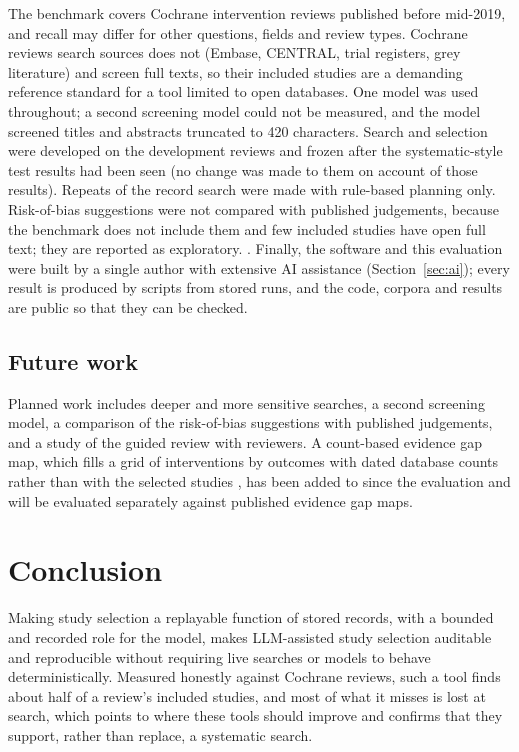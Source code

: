 The benchmark covers Cochrane intervention reviews published before mid-2019, and recall may differ for other
questions, fields and review types. Cochrane reviews search sources \tool{} does not (Embase, CENTRAL, trial
registers, grey literature) and screen full texts, so their included studies are a demanding reference standard for
a tool limited to open databases. One model was used throughout; a second screening model could not be measured,
and the model screened titles and abstracts truncated to 420 characters. Search and selection were developed on the
development reviews and frozen after the systematic-style test results had been seen (no change was made to them on
account of those results). Repeats of the record search were made with rule-based planning only. Risk-of-bias
suggestions were not compared with published judgements, because the benchmark does not include them and few
included studies have open full text; they are reported as exploratory. . Finally, the software and this evaluation were built
by a single author with extensive AI assistance (Section~\ref{sec:ai}); every result is produced by scripts from
stored runs, and the code, corpora and results are public so that they can be checked.

\subsection{Future work}

Planned work includes deeper and more sensitive searches, a second screening model, a comparison of the risk-of-bias
suggestions with published judgements, and a study of the guided review with reviewers. A count-based evidence gap
map, which fills a grid of interventions by outcomes with dated database counts rather than with the selected
studies \citep{snilstveit2016evidence}, has been added to \tool{} since the evaluation and will be evaluated
separately against published evidence gap maps.

\section{Conclusion}

Making study selection a replayable function of stored records, with a bounded and recorded role for the model,
makes LLM-assisted study selection auditable and reproducible without requiring live searches or models to behave
deterministically. Measured honestly against Cochrane reviews, such a tool finds about half of a review's included
studies, and most of what it misses is lost at search, which points to where these tools should improve and confirms
that they support, rather than replace, a systematic search.

